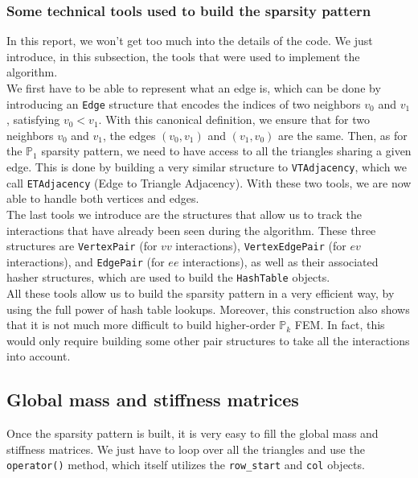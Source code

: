 \documentclass{article}
\theoremstyle{definition}
\theoremstyle{proposition}
\theoremstyle{theorem}
\theoremstyle{remark}
\theoremstyle{corollary}  %
\theoremstyle{exercise}
\theoremstyle{lemma}
\begin{document}
\subsubsection{Some technical tools used to build the sparsity pattern}

In this report, we won't get too much into the details of the code. We just introduce, in this subsection, the tools that were used to implement the algorithm. \\

We first have to be able to represent what an edge is, which can be done by introducing an \texttt{Edge} structure that encodes the indices of two neighbors $v_0$ and $v_1$, satisfying $v_0 < v_1$. With this canonical definition, we ensure that for two neighbors $v_0$ and $v_1$, the edges $(v_0, v_1)$ and $(v_1, v_0)$ are the same. Then, as for the $\mathbb{P}_1$ sparsity pattern, we need to have access to all the triangles sharing a given edge. This is done by building a very similar structure to \texttt{VTAdjacency}, which we call \texttt{ETAdjacency} (Edge to Triangle Adjacency). With these two tools, we are now able to handle both vertices and edges.\\

The last tools we introduce are the structures that allow us to track the interactions that have already been seen during the algorithm. These three structures are \texttt{VertexPair} (for $vv$ interactions), \texttt{VertexEdgePair} (for $ev$ interactions), and \texttt{EdgePair} (for $ee$ interactions), as well as their associated hasher structures, which are used to build the \texttt{HashTable} objects. \\

All these tools allow us to build the sparsity pattern in a very efficient way, by using the full power of hash table lookups. Moreover, this construction also shows that it is not much more difficult to build higher-order $\mathbb{P}_k$ FEM. In fact, this would only require building some other pair structures to take all the interactions into account. 

\subsection{Global mass and stiffness matrices} 

Once the sparsity pattern is built, it is very easy to fill the global mass and stiffness matrices. We just have to loop over all the triangles and use the \texttt{operator()} method, which itself utilizes the \texttt{row\_start} and \texttt{col} objects.
\end{document}
